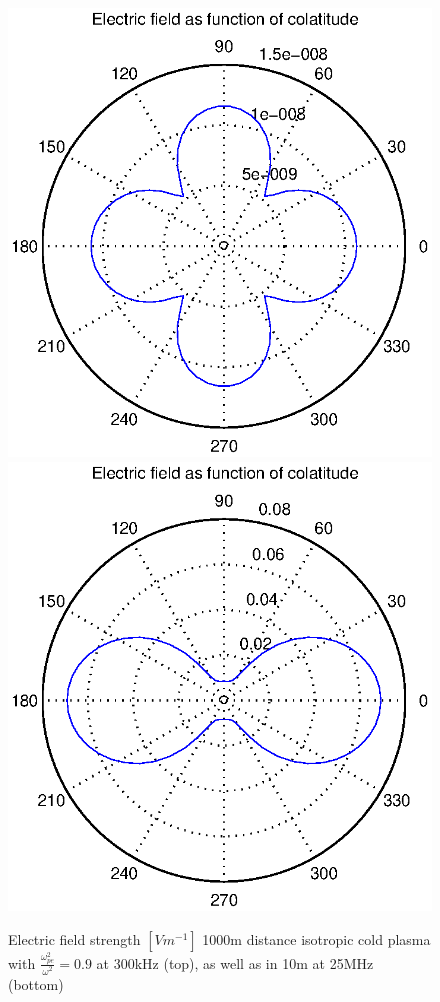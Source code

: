 \documentclass[a4paper,11pt]{thesis}
\begin{document}
\begin{figure}
\begin{center}
 \includegraphics[width=11.5cm]{DissPics/NFisocoldwithions1000m300kHz0.9.eps}
\includegraphics[width=11.5cm]{DissPics/NFisocoldwithions10m25MHz0.9.eps}   \caption{Electric field strength $[Vm^{-1}]$ 1000m distance isotropic cold plasma with $\frac{\omega_{pe}^2}{\omega^2}=0.9$ at 300kHz (top), as well as in 10m at 25MHz (bottom)}\label{fig:NFisocold_twommore}
\end{center}
\end{figure}
\end{document}
